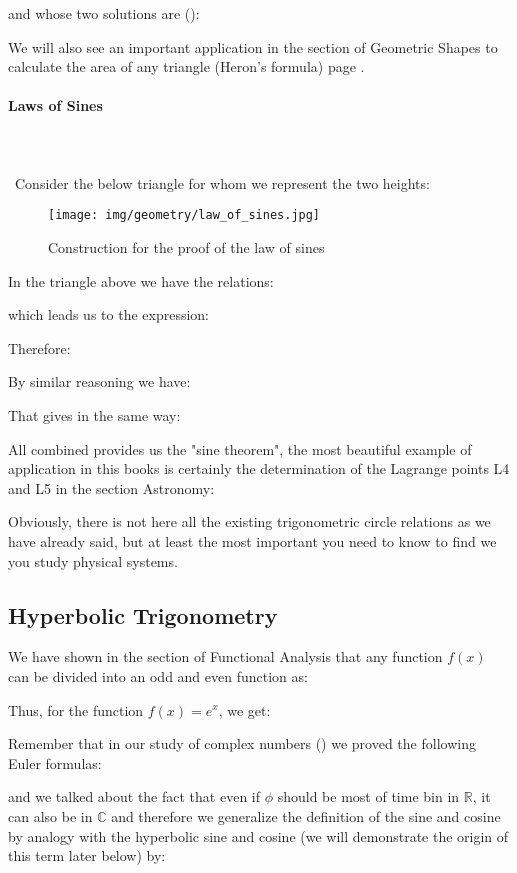 	and whose two solutions are ():
	
	We will also see an important application in the section of Geometric Shapes to calculate the area of any triangle (Heron's formula) page \pageref{heron formula}.
	
	\pagebreak
	\paragraph{Laws of Sines}\label{law of sines}\mbox{}\\\\\
	Consider the below triangle for whom we represent the two heights:
	\begin{figure}[H]
	\centering
	\texttt{[image: img/geometry/law\_of\_sines.jpg]}
	\caption{Construction for the proof of the law of sines}
	\end{figure}
	In the triangle above we have the relations:
	
	which leads us to the expression:
	
	Therefore:
	
	By similar reasoning we have:
	
	That gives in the same way:
	
	All combined provides us the "sine theorem", the most beautiful example of application in this books is certainly the determination of the Lagrange points L4 and L5 in the section Astronomy:
	
	Obviously, there is not here all the existing trigonometric circle relations as we have already said, but at least the most important you need to know to find we you study  physical systems.
	
	\pagebreak
	\subsection{Hyperbolic Trigonometry}\label{hyperbolic trigonometry}
	We have shown in the section of Functional Analysis that any function $f (x)$ can be divided into an odd and even function as:
	
	Thus, for the function $f(x)=e^x$, we get:
	
	Remember that in our study of complex numbers () we proved the following Euler formulas:
	
	and we talked about the fact that even if $\phi$ should be most of time bin in $\mathbb{R}$, it can also be in $\mathbb{C}$ and therefore we generalize the definition of the sine and cosine by analogy with the hyperbolic sine and cosine (we will demonstrate the origin of this term later below) by:
	
